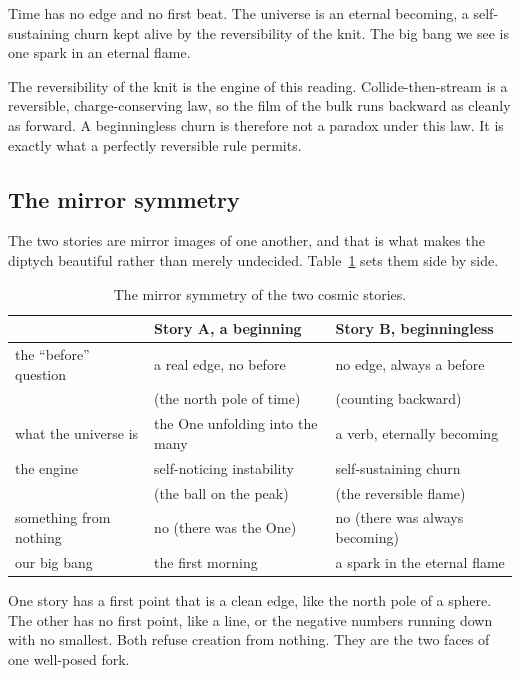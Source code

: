 \begin{result}[Story B]
Time has no edge and no first beat. The universe is an eternal becoming, a self-sustaining churn kept alive by the reversibility of the knit. The big bang we see is one spark in an eternal flame.
\end{result}

The reversibility of the knit is the engine of this reading. Collide-then-stream is a reversible, charge-conserving law, so the film of the bulk runs backward as cleanly as forward. A beginningless churn is therefore not a paradox under this law. It is exactly what a perfectly reversible rule permits.

\subsection{The mirror symmetry}

The two stories are mirror images of one another, and that is what makes the diptych beautiful rather than merely undecided. Table~\ref{tab:two-stories} sets them side by side.

\begin{table}[ht]
\centering
\begin{tabular}{@{}lll@{}}
\toprule
 & Story A, a beginning & Story B, beginningless \\
\midrule
the ``before'' question & a real edge, no before & no edge, always a before \\
 & (the north pole of time) & (counting backward) \\
what the universe is & the One unfolding into the many & a verb, eternally becoming \\
the engine & self-noticing instability & self-sustaining churn \\
 & (the ball on the peak) & (the reversible flame) \\
something from nothing & no (there was the One) & no (there was always becoming) \\
our big bang & the first morning & a spark in the eternal flame \\
\bottomrule
\end{tabular}
\caption{The mirror symmetry of the two cosmic stories.}
\label{tab:two-stories}
\end{table}

One story has a first point that is a clean edge, like the north pole of a sphere. The other has no first point, like a line, or the negative numbers running down with no smallest. Both refuse creation from nothing. They are the two faces of one well-posed fork.

